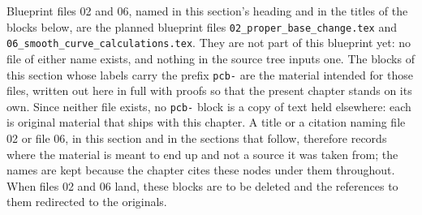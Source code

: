 Blueprint files 02 and 06, named in this section's heading and in the titles of
the blocks below, are the planned blueprint files
\texttt{02\_proper\_base\_change.tex} and
\texttt{06\_smooth\_curve\_calculations.tex}.  They are not part of this
blueprint yet: no file of either name exists, and nothing in the source tree
inputs one.  The blocks of this section whose labels carry the prefix
\texttt{pcb-} are the material intended for those files, written out here in
full with proofs so that the present chapter stands on its own.  Since neither
file exists, no \texttt{pcb-} block is a copy of text held elsewhere: each is
original material that ships with this chapter.  A title or a citation naming
file 02 or file 06, in this section and in the sections that follow, therefore
records where the material is meant to end up and not a source it was taken
from; the names are kept because the chapter cites these nodes under them
throughout.  When files 02 and 06 land, these blocks are to be deleted and the
references to them redirected to the originals.

